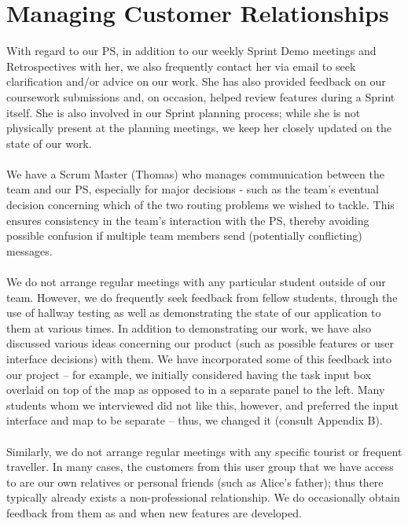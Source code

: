 \documentclass[a4paper, 10pt]{article}
\begin{document}
\section{Managing Customer Relationships}
With regard to our PS, in addition to our weekly Sprint Demo meetings and Retrospectives with her, we also frequently contact her via email to seek clarification and/or advice on our work. She has also provided feedback on our coursework submissions and, on occasion, helped review features during a Sprint itself. She is also involved in our Sprint planning process; while she is not physically present at the planning meetings, we keep her closely updated on the state of our work.
\\\\
We have a Scrum Master (Thomas) who manages communication between the team and our PS, especially for major decisions - such as the team's eventual decision concerning which of the two routing problems we wished to tackle. This ensures consistency in the team's interaction with the PS, thereby avoiding possible confusion if multiple team members send (potentially conflicting) messages.
\\\\
We do not arrange regular meetings with any particular student outside of our team. However, we do frequently seek feedback from fellow students, through the use of hallway testing as well as demonstrating the state of our application to them at various times. In addition to demonstrating our work, we have also discussed various ideas concerning our product (such as possible features or user interface decisions) with them. We have incorporated some of this feedback into our project -- for example, we initially considered having the task input box overlaid on top of the map as opposed to in a separate panel to the left. Many students whom we interviewed did not like this, however, and preferred the input interface and map to be separate -- thus, we changed it (consult Appendix B).
\\\\
Similarly, we do not arrange regular meetings with any specific tourist or frequent traveller. In many cases, the customers from this user group that we have access to are our own relatives or personal friends (such as Alice's father); thus there typically already exists a non-professional relationship. We do occasionally obtain feedback from them as and when new features are developed.
\end{document}
